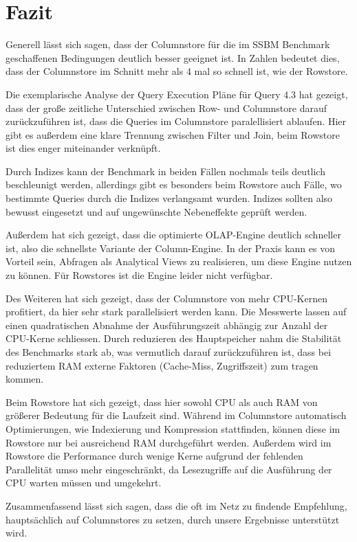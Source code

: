 \chapter{Fazit}\label{chapter:fazit}
Generell lässt sich sagen, dass der Columnstore für die im SSBM Benchmark
geschaffenen Bedingungen deutlich besser geeignet ist.
In Zahlen bedeutet dies, dass der Columnstore im Schnitt mehr als 4 mal so schnell ist,
wie der Rowstore.

Die exemplarische Analyse der Query Execution Pläne für Query 4.3 hat gezeigt,
dass der große zeitliche Unterschied zwischen Row- und 
Columnstore darauf zurückzuführen ist, dass die Queries im Columnstore paralellisiert ablaufen.
Hier gibt es außerdem eine klare Trennung zwischen Filter und Join,
beim Rowstore ist dies enger miteinander verknüpft. 


Durch Indizes kann der Benchmark in beiden Fällen nochmals teils deutlich beschleunigt werden,
allerdings gibt es besonders beim Rowstore auch Fälle,
wo bestimmte Queries durch die Indizes verlangsamt wurden.
Indizes sollten also bewusst eingesetzt und auf ungewünschte Nebeneffekte geprüft werden.

Außerdem hat sich gezeigt, dass die optimierte OLAP-Engine deutlich schneller ist,
also die schnellste Variante der Column-Engine.
In der Praxis kann es von Vorteil sein, Abfragen als Analytical Views zu realisieren,
um diese Engine nutzen zu können. Für Rowstores ist die Engine leider nicht verfügbar.

Des Weiteren hat sich gezeigt, dass der Columnstore von mehr CPU-Kernen profitiert,
da hier sehr stark parallelisiert werden kann. 
Die Messwerte lassen auf einen quadratischen Abnahme der Ausführungszeit
abhängig zur Anzahl der CPU-Kerne schliessen.
Durch reduzieren des Hauptspeicher nahm die Stabilität des Benchmarks stark ab,
was vermutlich darauf zurückzuführen ist, dass bei reduziertem RAM
externe Faktoren (Cache-Miss, Zugriffszeit) zum tragen kommen. 

Beim Rowstore hat sich gezeigt, dass hier sowohl CPU als auch RAM von größerer
Bedeutung für die Laufzeit sind. 
Während im Columnstore automatisch Optimierungen, wie Indexierung und Kompression stattfinden,
können diese im Rowstore nur bei ausreichend RAM durchgeführt werden. 
Außerdem wird im Rowstore die Performance durch wenige Kerne aufgrund der fehlenden Parallelität umso mehr eingeschränkt, da Lesezugriffe auf die Ausführung der CPU warten müssen und umgekehrt. 

Zusammenfassend lässt sich sagen, dass die oft im Netz zu findende Empfehlung,
hauptsächlich auf Columnstores zu setzen, durch unsere Ergebnisse unterstützt wird.
